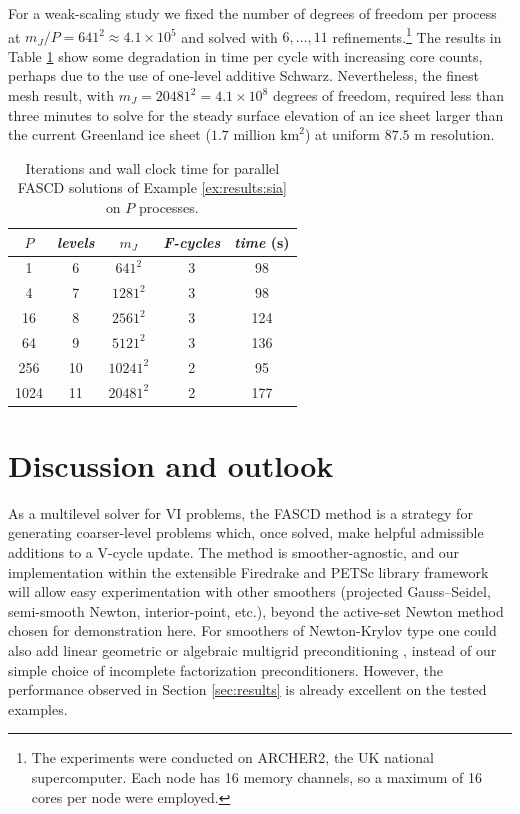 \documentclass[review,hidelinks,onefignum,onetabnum]{siamart220329}
\begin{document}
\begin{example}
For a weak-scaling study we fixed the number of degrees of freedom per process at $m_J/P=641^2 \approx 4.1 \times 10^5$ and solved with $6, \dots, 11$ refinements.\footnote{The experiments were conducted on ARCHER2, the UK national supercomputer. Each node has 16 memory channels, so a maximum of 16 cores per node were employed.}  The results in Table \ref{tab:results:siaweak} show some degradation in time per cycle with increasing core counts, perhaps due to the use of one-level additive Schwarz.  Nevertheless, the finest mesh result, with $m_J=20481^2=4.1 \times 10^8$ degrees of freedom, required less than three minutes to solve for the steady surface elevation of an ice sheet larger than the current Greenland ice sheet ($1.7$ million $\text{km}^2$) at uniform $87.5$ m resolution.

\begin{table}[ht]
\centering
\begin{tabular}{c@{\hskip 4mm}c@{\hskip 4mm}c@{\hskip 7mm}c@{\hskip 4mm}c}
\toprule
$P$ & \emph{levels} & $m_J$ & \emph{F-cycles} & \emph{time} (s) \\
\midrule
 1 & 6 & $641^2$ & 3 & 98 \\
 4 & 7 & $1281^2$ & 3 & 98 \\
 16 & 8 & $2561^2$ & 3 & 124 \\
 64 & 9 & $5121^2$ & 3 & 136 \\
 256 & 10 & $10241^2$ & 2 & 95 \\
 1024 & 11 & $20481^2$ & 2 & 177 \\
 \bottomrule
\end{tabular}
\bigskip
\caption{Iterations and wall clock time for parallel FASCD solutions of Example \ref{ex:results:sia} on $P$ processes.}
\label{tab:results:siaweak}
\end{table}
\end{example}


\section{Discussion and outlook} \label{sec:discussion}

As a multilevel solver for VI problems, the FASCD method is a strategy for generating coarser-level problems which, once solved, make helpful admissible additions to a V-cycle update.  The method is smoother-agnostic, and our implementation within the extensible Firedrake \cite{Rathgeberetal2016} and PETSc \cite{Balayetal2023} library framework will allow easy experimentation with other smoothers (projected Gauss--Seidel, semi-smooth Newton, interior-point, etc.), beyond the active-set Newton method chosen for demonstration here.  For smoothers of Newton-Krylov type one could also add linear geometric or algebraic multigrid preconditioning \cite{Trottenbergetal2001}, instead of our simple choice of incomplete factorization preconditioners.  However, the performance observed in Section \ref{sec:results} is already excellent on the tested examples.
\end{document}
